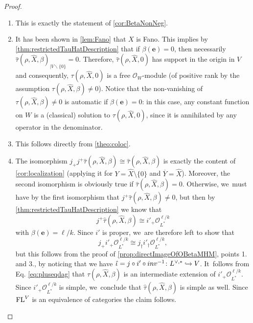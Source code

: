 \documentclass[11pt]{article}
\newcommand{\skpt}{\smallskip}
\newcommand\hto{\mathrel{\lhook\joinrel\to}}
\newcommand{\bme}{{\boldsymbol{e}}}
\newcommand{\cO}{\mathcal{O}}\let\O\cO
\DeclareMathOperator{\FL}{\textup{FL}}
\begin{document}
\skpt
\begin{proof}
\begin{enumerate}
\item
This is exactly the statement of \cref{cor:BetaNonNeg}.

\item
It has been shown in \cref{lem:Fano} that $X$ is Fano. This implies by \cref{thm:restrictedTauHatDescription} that if $\beta(\bme)=0$, then necessarily $\hat{\tau}(\rho,\hat{X},\beta)_{|V\backslash\{0\}}=0$. Therefore, $\hat{\tau}(\rho,\hat{X},0)$ has support in the origin in $V$ and consequently, $\tau(\rho,\hat{X},0)$ is a free $\cO_W$\nobreakdash-mod\-ule (of positive rank by the assumption $\tau(\rho,\hat{X},\beta)\!\neq\! 0$). Notice that the non-vanishing of \hbox{$\tau(\rho,\hat{X},\beta)\!\neq\! 0$} is automatic if $\beta(\bme)=0$: in this case, any constant function on $W$ is a (classical) solution to $\tau(\rho,\hat{X},0)$, since it is annihilated by any operator in the denominator.
\item
This follows directly from \cref{theo:coloc}.
\item
The isomorphism
$j_+ j^+ \hat{\tau}(\rho, \hat{X}, \beta) \cong \hat{\tau}(\rho, \hat{X}, \beta)$ is exactly the content of \cref{cor:localization} (applying it for $Y=\hat{X}\setminus \{0\}$ and $\overline{Y}=\hat{X}$). Moreover, the second isomorphism is obviously true if $\hat{\tau}(\rho, \hat{X}, \beta)=0$. Otherwise, we~must have by the first isomorphism that
$j^+\hat{\tau}(\rho, \hat{X}, \beta)\neq 0$, but then by
\cref{thm:restrictedTauHatDescription} we know that
\[
j^+\hat{\tau}(\rho, \hat{X}, \beta) \cong
i'_+ \O_{L^*}^{\ell/k}
\]
with $\beta(\bme)=\ell/k$. Since $i'$ is proper, we~are therefore left to show that
\begin{equation}\label{eq:pluseqdag}
j_+ i'_+ \O_{L^*}^{\ell/k} \cong j_\dag i'_\dag \O_{L^*}^{\ell/k},
\end{equation}
but this follows from the proof of \cref{prop:directImageOfOBetaMHM}, points 1. and 3., by noticing that we have $\hat{\iota}=j\circ i' \circ \textup{inv}^{-1} \colon L^{\vee,*}\hto V$. It~follows from Eq. \eqref{eq:pluseqdag} that $\hat{\tau}(\rho, \hat{X}, \beta)$ is an intermediate extension of $i'_+ \O_{L^*}^{\ell/k}$. Since $ i'_+ \O_{L^*}^{\ell/k}$ is simple, we~conclude that $\hat{\tau}(\rho, \hat{X}, \beta)$ is simple as well. Since $\FL^V$ is an equivalence of categories the claim follows.\qedhere
\end{enumerate}
\end{proof}
\end{document}
